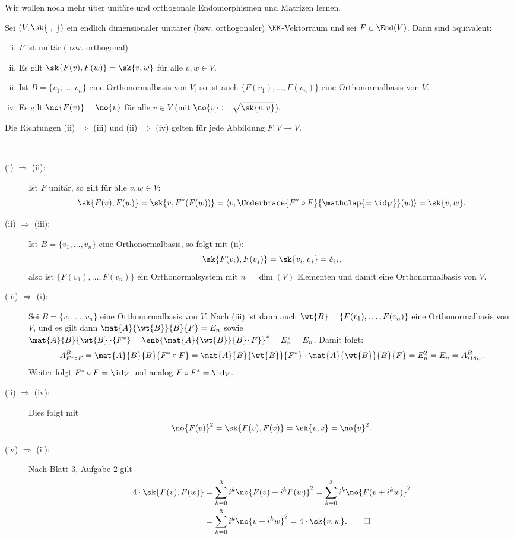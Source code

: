 Wir wollen noch mehr über unitäre und orthogonale Endomorphismen und Matrizen lernen.

\begin{satz}
	\label{satz:6.8}
	Sei $(V,\sk{\cdot,\cdot})$ ein endlich dimensionaler unitärer (bzw. orthogonaler) $\KK$-Vektorraum und sei $F \in \End(V)$.
	Dann sind äquivalent:
	\begin{enumerate}[(i)]
		\item $F$ ist unitär (bzw. orthogonal)
		\item Es gilt $\sk{F(v),F(w)} = \sk{v,w}$ für alle $v,w \in V$.
		\item Ist $B = \{v_1,\dots,v_n\}$ eine Orthonormalbasis von $V$, so ist auch $\{F(v_1),\dots,F(v_n)\}$ eine Orthonormalbasis von $V$.
		\item Es gilt $\no{F(v)} = \no{v}$ für alle $v \in V$ (mit $\no{v} := \sqrt{\sk{v,v}}$).
	\end{enumerate}
	Die Richtungen (ii) $\Rightarrow$ (iii) und (ii) $\Rightarrow$ (iv) gelten für jede Abbildung $F \colon V \rightarrow V$.
\end{satz}

\begin{beweis} \mbox{} \\[-.9cm]
	\begin{description}
		\item[(i) $\Rightarrow$ (ii):] Ist $F$ unitär, so gilt für alle $v,w \in V$:
		\[
			\sk{F(v),F(w)} = \sk{v,F^*(F(w))} = \langle v,\Underbrace{F^*\circ F}{\mathclap{=\id_V}}(w)\rangle = \sk{v,w}.
		\]
		\item[(ii) $\Rightarrow$ (iii):] Ist $B = \{v_1,\dots,v_n\}$ eine Orthonormalbasis, so folgt mit (ii):
		\[
			\sk{F(v_i),F(v_j)} = \sk{v_i,v_j} = \delta_{ij},
		\]
		also ist $\{F(v_1),\dots,F(v_n)\}$ ein Orthonormalsystem mit $n = \dim(V)$ Elementen und damit eine Orthonormalbasis von $V$.
		\item[(iii) $\Rightarrow$ (i):] Sei $B = \{v_1,\dots,v_n\}$ eine Orthonormalbasis von $V$.
		Nach (iii) ist dann auch $\wt{B} = \{F(v_1),\dots,F(v_n)\}$ eine Orthonormalbasis von $V$, und es gilt dann $\mat{A}{\wt{B}}{B}{F} = E_n$ sowie $\mat{A}{B}{\wt{B}}{F^*} = \enb{\mat{A}{\wt{B}}{B}{F}}^* = E_n^* = E_n$.
		Damit folgt:
		\[
			A^B_{F^* \circ F} = \mat{A}{B}{B}{F^* \circ F} = \mat{A}{B}{\wt{B}}{F^*} \cdot \mat{A}{\wt{B}}{B}{F} = E_n^2 = E_n = A^B_{\id_V}.
		\]
		Weiter folgt $F^* \circ F = \id_V$ und analog $F \circ F^* = \id_V$.
		\item[(ii) $\Rightarrow$ (iv):] Dies folgt mit
		\[
			\no{F(v)}^2 = \sk{F(v),F(v)} = \sk{v,v} = \no{v}^2.
		\]
		\item[(iv) $\Rightarrow$ (ii):] Nach Blatt 3, Aufgabe 2 gilt
		\begin{align*}
			4 \cdot \sk{F(v),F(w)} &= \sum_{k=0}^{3} i^k \no{F(v) + i^k F(w)}^2 
			= \sum_{k=0}^{3} i^k \no{F(v+i^kw)}^2 \\
			&= \sum_{k=0}^{3} i^k \no{v+i^kw}^2 = 4 \cdot \sk{v,w}. \qedhere
		\end{align*}
	\end{description}	
\end{beweis}


